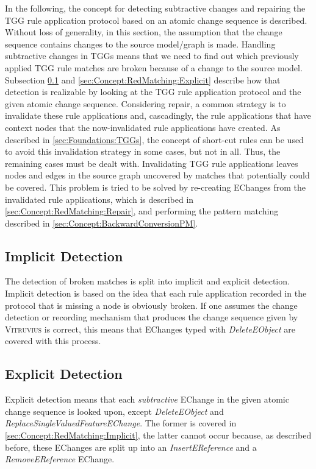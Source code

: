 In the following, the concept for detecting subtractive changes and repairing the TGG rule application protocol based on an atomic change sequence is described.
Without loss of generality, in this section, the assumption that the change sequence contains changes to the source model/graph is made.
Handling subtractive changes in TGGs means that we need to find out which previously applied TGG rule matches are broken because of a change to the source model.
Subsection \ref{sec:Concept:RedMatching:Implicit} and \autoref{sec:Concept:RedMatching:Explicit} describe how that detection is realizable by looking at the TGG rule application protocol and the given atomic change sequence.
Considering repair, a common strategy is to invalidate these rule applications and, cascadingly, the rule applications that have context nodes that the now-invalidated rule applications have created.
As described in \autoref{sec:Foundations:TGGs}, the concept of short-cut rules \cite{fritsche_short-cut-theoretical_2018, fritsche_short-cut-rules-repair-tgg_2021, fritsche_higher_order_short_cut_rules_2023} can be used to avoid this invalidation strategy in some cases, but not in all. Thus, the remaining cases must be dealt with.
Invalidating TGG rule applications leaves nodes and edges in the source graph uncovered by matches that potentially could be covered.
This problem is tried to be solved by re-creating EChanges from the invalidated rule applications, which is described in \autoref{sec:Concept:RedMatching:Repair}, and performing the pattern matching described in \autoref{sec:Concept:BackwardConversionPM}.

\subsection{Implicit Detection}
\label{sec:Concept:RedMatching:Implicit}
The detection of broken matches is split into implicit and explicit detection.
Implicit detection is based on the idea that each rule application recorded in the protocol that is missing a node is obviously broken.
If one assumes the change detection or recording mechanism that produces the change sequence given by \textsc{Vitruvius} is correct, this means that EChanges typed with \emph{DeleteEObject} are covered with this process.

\subsection{Explicit Detection}
\label{sec:Concept:RedMatching:Explicit}
Explicit detection means that each \emph{subtractive} EChange in the given atomic change sequence is looked upon, except \emph{DeleteEObject} and \emph{ReplaceSingleValuedFeatureEChange}. The former is covered in \autoref{sec:Concept:RedMatching:Implicit}, the latter cannot occur because, as described before, these EChanges are split up into an \emph{InsertEReference} and a \emph{RemoveEReference} EChange.

